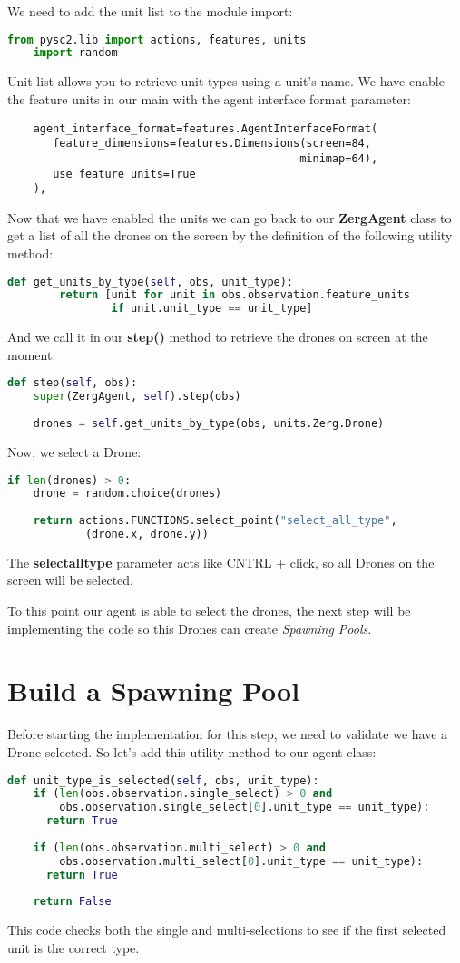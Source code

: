 \documentclass[11pt]{report}            %
\begin{document}
We need to add the unit list to the module import:
\begin{lstlisting}[language=Python]
    from pysc2.lib import actions, features, units
    import random                
\end{lstlisting}
Unit list allows you to retrieve unit types using a unit's name. We have enable the feature units in our main with the agent interface format parameter:
\begin{lstlisting}
    agent_interface_format=features.AgentInterfaceFormat(
       feature_dimensions=features.Dimensions(screen=84,
                                             minimap=64),
       use_feature_units=True
    ),
\end{lstlisting}
Now that we have enabled the units we can go back to our \textbf{ZergAgent} class to get a list of all the drones on the screen by the definition of the following utility method:
\begin{lstlisting}[language=Python]
def get_units_by_type(self, obs, unit_type):
        return [unit for unit in obs.observation.feature_units
                if unit.unit_type == unit_type]
\end{lstlisting}
And we call it in our \textbf{step()} method to retrieve the drones on screen at the moment.
\begin{lstlisting}[language=Python]
def step(self, obs):
    super(ZergAgent, self).step(obs)
    
    drones = self.get_units_by_type(obs, units.Zerg.Drone)
\end{lstlisting}
Now, we select a Drone:
\begin{lstlisting}[language=Python]
if len(drones) > 0:
    drone = random.choice(drones)
      
    return actions.FUNCTIONS.select_point("select_all_type",
            (drone.x, drone.y))
\end{lstlisting}
The \textbf{select\textunderscore all\textunderscore type} parameter acts like CNTRL + click, so all Drones on the screen will be selected. 

To this point our agent is able to select the drones, the next step will be implementing the code so this Drones can create \emph{Spawning Pools}.
\chapter{Build a Spawning Pool}
Before starting the implementation for this step, we need to validate we have a Drone selected. So let's add this utility method to our agent class:
\begin{lstlisting}[language=Python]
def unit_type_is_selected(self, obs, unit_type):
    if (len(obs.observation.single_select) > 0 and
        obs.observation.single_select[0].unit_type == unit_type):
      return True
    
    if (len(obs.observation.multi_select) > 0 and
        obs.observation.multi_select[0].unit_type == unit_type):
      return True
    
    return False
\end{lstlisting}
This code checks both the single and multi-selections to see if the first selected unit is the correct type.
\end{document}
